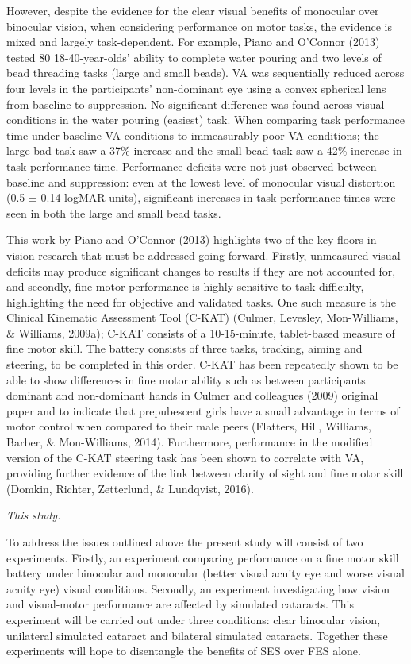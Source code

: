 \documentclass[
  english,
  man,floatsintext]{apa6}
\begin{document}
However, despite the evidence for the clear visual benefits of monocular over binocular vision, when considering performance on motor tasks, the evidence is mixed and largely task-dependent.
For example, Piano and O'Connor (2013) tested 80 18-40-year-olds' ability to complete water pouring and two levels of bead threading tasks (large and small beads).
VA was sequentially reduced across four levels in the participants' non-dominant eye using a convex spherical lens from baseline to suppression.
No significant difference was found across visual conditions in the water pouring (easiest) task.
When comparing task performance time under baseline VA conditions to immeasurably poor VA conditions; the large bad task saw a 37\% increase and the small bead task saw a 42\% increase in task performance time.
Performance deficits were not just observed between baseline and suppression: even at the lowest level of monocular visual distortion (0.5 ± 0.14 logMAR units), significant increases in task performance times were seen in both the large and small bead tasks.

This work by Piano and O'Connor (2013) highlights two of the key floors in vision research that must be addressed going forward.
Firstly, unmeasured visual deficits may produce significant changes to results if they are not accounted for, and secondly, fine motor performance is highly sensitive to task difficulty, highlighting the need for objective and validated tasks.
One such measure is the Clinical Kinematic Assessment Tool (C-KAT) (Culmer, Levesley, Mon-Williams, \& Williams, 2009a); C-KAT consists of a 10-15-minute, tablet-based measure of fine motor skill.
The battery consists of three tasks, tracking, aiming and steering, to be completed in this order.
C-KAT has been repeatedly shown to be able to show differences in fine motor ability such as between participants dominant and non-dominant hands in Culmer and colleagues (2009) original paper and to indicate that prepubescent girls have a small advantage in terms of motor control when compared to their male peers (Flatters, Hill, Williams, Barber, \& Mon-Williams, 2014).
Furthermore, performance in the modified version of the C-KAT steering task has been shown to correlate with VA, providing further evidence of the link between clarity of sight and fine motor skill (Domkin, Richter, Zetterlund, \& Lundqvist, 2016).

\emph{This study.}

To address the issues outlined above the present study will consist of two experiments.
Firstly, an experiment comparing performance on a fine motor skill battery under binocular and monocular (better visual acuity eye and worse visual acuity eye) visual conditions.
Secondly, an experiment investigating how vision and visual-motor performance are affected by simulated cataracts.
This experiment will be carried out under three conditions: clear binocular vision, unilateral simulated cataract and bilateral simulated cataracts.
Together these experiments will hope to disentangle the benefits of SES over FES alone.
\end{document}
